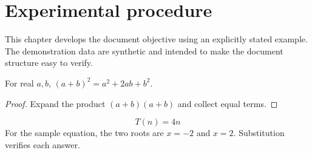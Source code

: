 \section{Experimental procedure}


\label{sec:chapter2}
This chapter develops the document objective using an explicitly stated example. The demonstration data are synthetic and intended to make the document structure easy to verify.

\begin{demotheorem}
For real $a,b$, $(a+b)^2=a^2+2ab+b^2$.
\end{demotheorem}
\begin{proof}
Expand the product $(a+b)(a+b)$ and collect equal terms.
\end{proof}
\[T(n)=4n\]
For the sample equation, the two roots are $x=-2$ and $x=2$. Substitution verifies each answer.
